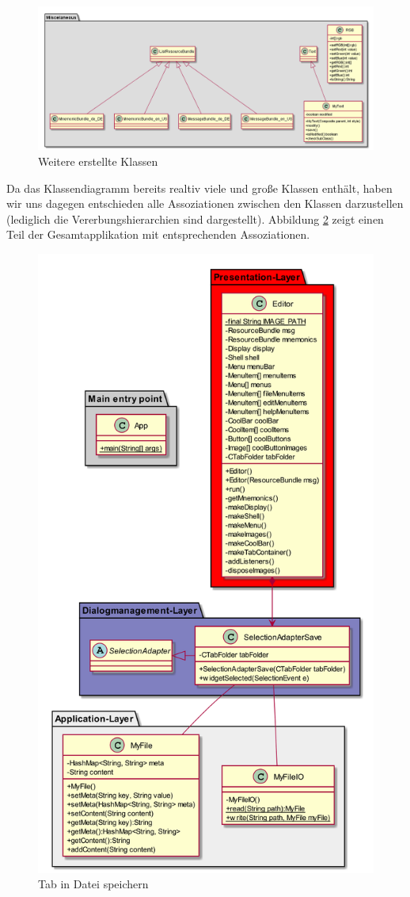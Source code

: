 \begin{figure}[H]
    \centering
    \includegraphics[width=0.7\linewidth]{figures/class/class_diagram_misc.png}
    \caption{Weitere erstellte Klassen}
    \label{fig:miscclasses}
\end{figure}

\noindent
Da das Klassendiagramm bereits realtiv viele und große Klassen enthält, haben wir uns dagegen entschieden alle
Assoziationen zwischen den Klassen darzustellen (lediglich die Vererbungshierarchien sind dargestellt).
Abbildung \ref{fig:example} zeigt einen Teil der Gesamtapplikation mit entsprechenden Assoziationen.

\begin{figure}[H]
    \centering
    \includegraphics[width=0.7\linewidth]{figures/class/class_diagram_example.png}
    \caption{Tab in Datei speichern}
    \label{fig:example}
\end{figure}

